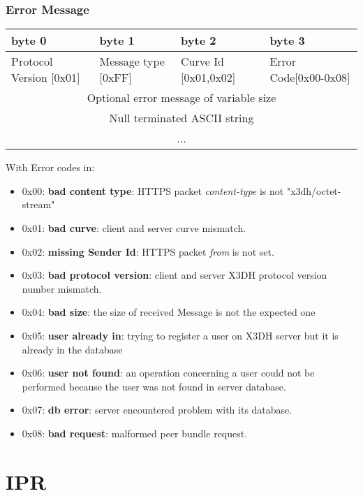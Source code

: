 \documentclass[a4paper,11pt]{article}
\begin{document}
    \subsubsection{Error Message}
      \begin{center}
      \begin{tabular}{ | p{1.4in} | p{1.4in} | p{1.4in} | p{1.4in} |}
        \hline
        \cellcolor[gray]{0.85} byte 0 & \cellcolor[gray]{0.85} byte 1 & \cellcolor[gray]{0.85} byte 2 & \cellcolor[gray]{0.85}byte 3\\
        \hline
        Protocol Version [0x01] & Message type [0xFF] & Curve Id [0x01,0x02] & Error Code[0x00-0x08]\\
        \hline
        \multicolumn{4}{|c|}{Optional error message of variable size}\\
        \multicolumn{4}{|c|}{Null terminated ASCII string}\\
        \multicolumn{4}{|c|}{...}\\
        \hline        
      \end{tabular}
      \end{center}

    With Error codes in:
    \begin{itemize}
      \item 0x00: \textbf{bad content type}: HTTPS packet \textit{content-type} is not "x3dh/octet-stream"
      \item 0x01: \textbf{bad curve}: client and server curve mismatch.
      \item 0x02: \textbf{missing Sender Id}: HTTPS packet \textit{from} is not set.
      \item 0x03: \textbf{bad protocol version}: client and server X3DH protocol version number mismatch.
      \item 0x04: \textbf{bad size}: the size of received Message is not the expected one
      \item 0x05: \textbf{user already in}: trying to register a user on X3DH server but it is already in the database
      \item 0x06: \textbf{user not found}: an operation concerning a user could not be performed because the user was not found in server database.
      \item 0x07: \textbf{db error}: server encountered problem with its database.
      \item 0x08: \textbf{bad request}: malformed peer bundle request.
    \end{itemize}
\section{IPR}
\end{document}
